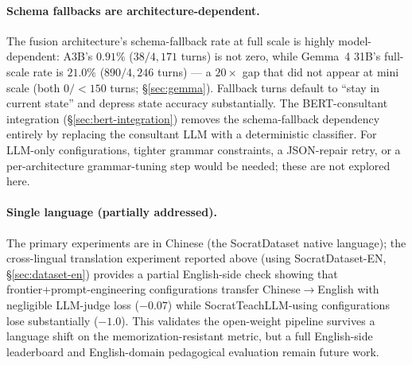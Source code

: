 \documentclass[11pt]{article}
\begin{document}
\paragraph{Schema fallbacks are architecture-dependent.} The fusion architecture's schema-fallback rate at full scale is highly model-dependent: A3B's $0.91\%$ ($38/4{,}171$ turns) is not zero, while Gemma~4 31B's full-scale rate is $21.0\%$ ($890/4{,}246$ turns) --- a $20\times$ gap that did not appear at mini scale (both $0/<150$ turns; \S\ref{sec:gemma}). Fallback turns default to ``stay in current state'' and depress state accuracy substantially. The BERT-consultant integration (\S\ref{sec:bert-integration}) removes the schema-fallback dependency entirely by replacing the consultant LLM with a deterministic classifier. For LLM-only configurations, tighter grammar constraints, a JSON-repair retry, or a per-architecture grammar-tuning step would be needed; these are not explored here.

\paragraph{Single language (partially addressed).} The primary experiments are in Chinese (the SocratDataset native language); the cross-lingual translation experiment reported above (using SocratDataset-EN, \S\ref{sec:dataset-en}) provides a partial English-side check showing that frontier+prompt-engineering configurations transfer Chinese$\to$English with negligible LLM-judge loss ($-0.07$) while SocratTeachLLM-using configurations lose substantially ($-1.0$). This validates the open-weight pipeline survives a language shift on the memorization-resistant metric, but a full English-side leaderboard and English-domain pedagogical evaluation remain future work.
\end{document}

